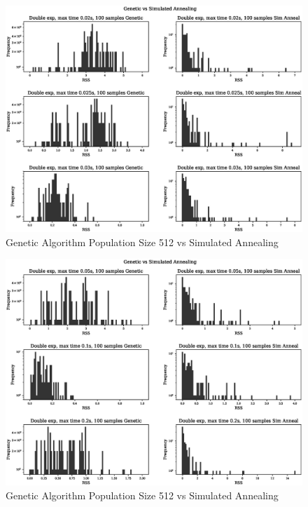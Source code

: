 \begin{figure}[h]
  \begin{center}
    \includegraphics[width=15.0cm]{appendix/sim_anneal_genetic/pop_512/plot_name_10.eps}
    \caption{Genetic Algorithm Population Size 512 vs Simulated Annealing}
    \label{fig:ga_vs_sim_512_2}
  \end{center}
\end{figure}

\begin{figure}[h]
  \begin{center}
    \includegraphics[width=15.0cm]{appendix/sim_anneal_genetic/pop_512/plot_name_11.eps}
    \caption{Genetic Algorithm Population Size 512 vs Simulated Annealing}
    \label{fig:ga_vs_sim_512_3}
  \end{center}
\end{figure}






